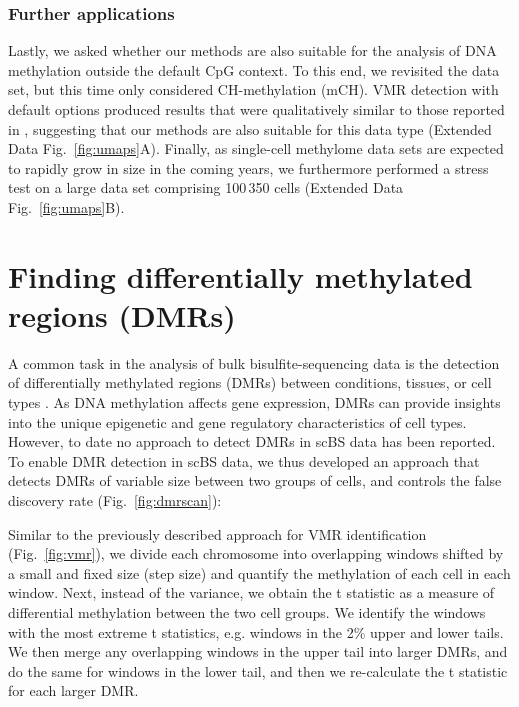 \documentclass[10pt]{article}
\begin{document}
\subsubsection*{Further applications}

Lastly, we asked whether our methods are also suitable for the analysis of DNA methylation outside the default CpG context.
To this end, we revisited the \citet{luo2017single} data set, but this time only considered CH-methylation (mCH).
VMR detection with default options produced results that were qualitatively similar to those reported in \citet{luo2017single}, suggesting that our methods are also suitable for this data type (Extended Data Fig.~\ref{fig:umaps}A).
Finally, as single-cell methylome data sets are expected to rapidly grow in size in the coming years, we furthermore performed a stress test on a large data set comprising 100\,350 cells \citep{liu2021dna} (Extended Data Fig.~\ref{fig:umaps}B).




\section*{Finding differentially methylated regions (DMRs)}

A common task in the analysis of bulk bisulfite-sequencing data is the detection of differentially methylated regions (DMRs) between conditions, tissues, or cell types \citep{Hebestreit2013, dmrseq}.
As DNA methylation affects gene expression, DMRs can provide insights into the unique epigenetic and gene regulatory characteristics of cell types.
However, to date no approach to detect DMRs in scBS data has been reported.
To enable DMR detection in scBS data, we thus developed an approach that detects DMRs of variable size between two groups of cells, and controls the false discovery rate (Fig.~\ref{fig:dmrscan}):

Similar to the previously described approach for VMR identification (Fig.~\ref{fig:vmr}), we divide each chromosome into overlapping windows shifted by a small and fixed size (step size) and quantify the methylation of each cell in each window.
Next, instead of the variance, we obtain the t statistic as a measure of differential methylation between the two cell groups.
We identify the windows with the most extreme t statistics, e.g. windows in the 2\% upper and lower tails.
We then merge any overlapping windows in the upper tail into larger DMRs, and do the same for windows in the lower tail, and then we re-calculate the t statistic for each larger DMR.
\end{document}
